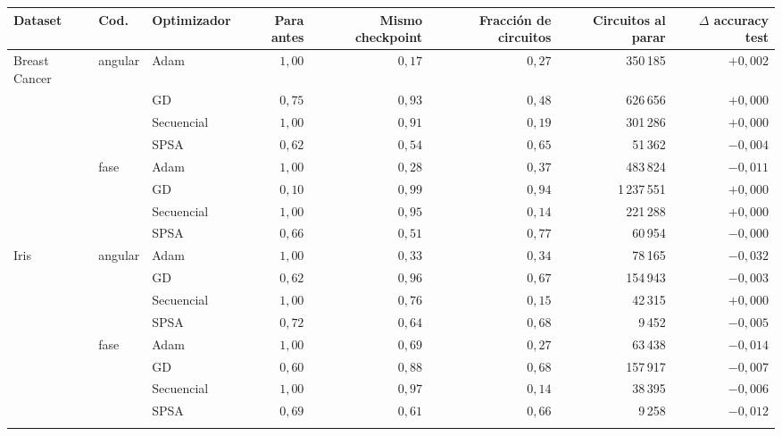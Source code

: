 \begin{tabular}{lllrrrrr}
\toprule
Dataset & Cod. & Optimizador & Para antes & Mismo checkpoint & Fracción de circuitos & Circuitos al parar & $\Delta$ accuracy test \\
\midrule
Breast Cancer & angular & Adam & $1{,}00$ & $0{,}17$ & $0{,}27$ & 350\,185 & $+0{,}002$ \\
 &  & GD & $0{,}75$ & $0{,}93$ & $0{,}48$ & 626\,656 & $+0{,}000$ \\
 &  & Secuencial & $1{,}00$ & $0{,}91$ & $0{,}19$ & 301\,286 & $+0{,}000$ \\
 &  & SPSA & $0{,}62$ & $0{,}54$ & $0{,}65$ & 51\,362 & $-0{,}004$ \\
\addlinespace
 & fase & Adam & $1{,}00$ & $0{,}28$ & $0{,}37$ & 483\,824 & $-0{,}011$ \\
 &  & GD & $0{,}10$ & $0{,}99$ & $0{,}94$ & 1\,237\,551 & $+0{,}000$ \\
 &  & Secuencial & $1{,}00$ & $0{,}95$ & $0{,}14$ & 221\,288 & $+0{,}000$ \\
 &  & SPSA & $0{,}66$ & $0{,}51$ & $0{,}77$ & 60\,954 & $-0{,}000$ \\
\addlinespace
\midrule
Iris & angular & Adam & $1{,}00$ & $0{,}33$ & $0{,}34$ & 78\,165 & $-0{,}032$ \\
 &  & GD & $0{,}62$ & $0{,}96$ & $0{,}67$ & 154\,943 & $-0{,}003$ \\
 &  & Secuencial & $1{,}00$ & $0{,}76$ & $0{,}15$ & 42\,315 & $+0{,}000$ \\
 &  & SPSA & $0{,}72$ & $0{,}64$ & $0{,}68$ & 9\,452 & $-0{,}005$ \\
\addlinespace
 & fase & Adam & $1{,}00$ & $0{,}69$ & $0{,}27$ & 63\,438 & $-0{,}014$ \\
 &  & GD & $0{,}60$ & $0{,}88$ & $0{,}68$ & 157\,917 & $-0{,}007$ \\
 &  & Secuencial & $1{,}00$ & $0{,}97$ & $0{,}14$ & 38\,395 & $-0{,}006$ \\
 &  & SPSA & $0{,}69$ & $0{,}61$ & $0{,}66$ & 9\,258 & $-0{,}012$ \\
\addlinespace
\bottomrule
\end{tabular}
